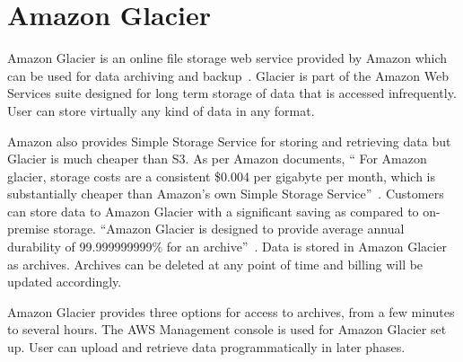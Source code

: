 \section{Amazon Glacier}

Amazon Glacier is an online file storage web service provided by Amazon which
can be used for data archiving and backup~\cite{hid-sp18-420-Amazon-Glacier}.
Glacier is part of the Amazon Web Services suite designed for long term storage
of data that is accessed infrequently. User can store virtually any kind of data
in any format.

Amazon also provides Simple Storage Service for storing and retrieving data but
Glacier is much cheaper than S3. As per Amazon documents, `` For Amazon glacier,
storage costs are a consistent \$0.004 per gigabyte per month, which is
substantially cheaper than Amazon's own Simple Storage
Service''~\cite{hid-sp18-420-Amazon-Glacier-FAQ}. Customers can store data to
Amazon Glacier with a significant saving as compared to on-premise storage.
``Amazon Glacier is designed to provide average annual durability of
99.999999999\% for an archive''~\cite{hid-sp18-420-Amazon-Glacier}. Data is
stored in Amazon Glacier as archives. Archives can be deleted at any point of
time and billing will be updated accordingly.

Amazon Glacier provides three options for access to archives, from a few minutes
to several hours. The AWS Management console is used for Amazon Glacier set up.
User can upload and retrieve data programmatically in later phases.
